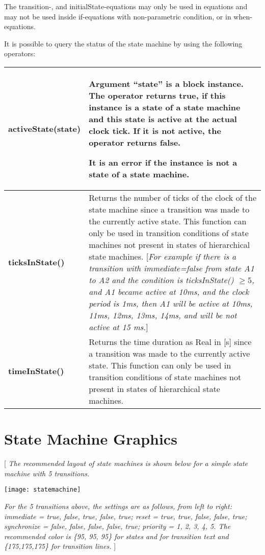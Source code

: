 The transition-, and initialState-equations may only be used in
equations and may not be used inside if-equations with non-parametric
condition, or in when-equations.

It is possible to query the status of the state machine by using the
following operators:

\begin{longtable}[]{|p{4cm}|p{10cm}|}
\hline \endhead
\textbf{activeState}(state)&
Argument ``state'' is a block instance. The operator returns
\textbf{true}, if this instance is a state of a state machine and this
state is active at the actual clock tick. If it is not active, the
operator returns \textbf{false}.

It is an error if the instance is not a state of a state machine.\\ \hline
\textbf{ticksInState()} & Returns the number of ticks of the clock of
the state machine since a transition was made to the currently active
state. This function can only be used in transition conditions of state
machines not present in states of hierarchical state machines.
{[}\emph{For example if there is a transition with immediate=false from
state A1 to A2 and the condition is ticksInState() $\ge 5$, and A1 became
active at 10ms, and the clock period is 1ms, then A1 will be active at
10ms, 11ms, 12ms, 13ms, 14ms, and will be not active at 15 ms.}{]}\\ \hline
\textbf{timeInState()} & Returns the time duration as Real in {[}s{]}
since a transition was made to the currently active state. This function
can only be used in transition conditions of state machines not present
in states of hierarchical state machines.\\ \hline

\end{longtable}

\section{State Machine Graphics}

{[} \emph{The recommended layout of state machines is shown below for a
simple state machine with 5 transitions. }

\texttt{[image: statemachine]}

\emph{For
the 5 transitions above, the settings are as follows, from left to
right: immediate = true, false, true, false, true; reset = true, true,
false, false, true; synchronize = false, false, false, false, true;
priority = 1, 2, 3, 4, 5. The recommended color is \{95, 95, 95\} for
states and for transition text and \{175,175,175\} for transition
lines.} {]}

